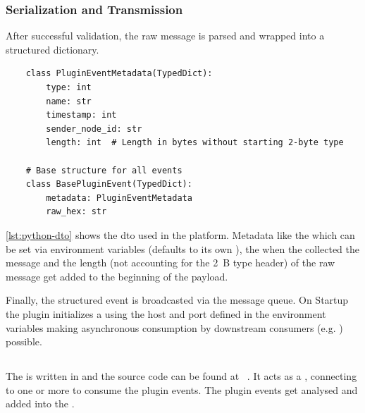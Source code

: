\subsubsection{Serialization and Transmission}
After successful validation, the raw message is parsed and wrapped into a structured dictionary.

\begin{listing}[htbp]
    \begin{verbatim}
    class PluginEventMetadata(TypedDict):
        type: int
        name: str
        timestamp: int
        sender_node_id: str
        length: int  # Length in bytes without starting 2-byte type

    # Base structure for all events
    class BasePluginEvent(TypedDict):
        metadata: PluginEventMetadata
        raw_hex: str
    \end{verbatim}
    \caption{
        Python  definitions used as a wrapper for gossip events 
        by the ~\cite{kraus_lnhistorypythonclient_2026}.
    }
    \label{lst:python-dto}
\end{listing}

\autoref{lst:python-dto} shows the \gls{dto} used in the  platform.
Metadata like the  which can be set via environment variables (defaults to its own ),
the  when the  collected the message
and the length (not accounting for the \qty{2}{B} type header) of the raw message
get added to the beginning of the payload.

Finally, the structured event is broadcasted via the  message queue. 
On Startup the plugin initializes a  using the host and port defined in the environment variables 
making asynchronous consumption by downstream consumers (e.g. ) possible.


\subsection{}
The  is written in  and the source code can be found at ~\cite{kraus_gossipprocessor_2026}. 
It acts as a , connecting to one or more   to consume the plugin events.
The plugin events get analysed and added into the .


